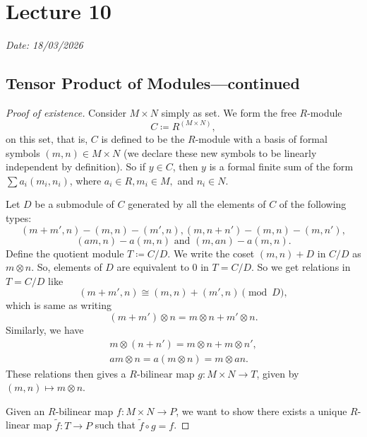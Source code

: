 \chapter{Lecture 10}

\hfill {\footnotesize \textit{Date: 18/03/2026}}

\section{Tensor Product of Modules---continued}
\begin{proof}[Proof of existence]
    Consider \( M \times N \) simply as set. We form the free  \( R \)-module
     \[
        C \coloneq R^{(M \times N)},
    \]
     on this set, that is, \( C \) is defined to be the  \( R \)-module with a basis of formal symbols  \( (m, n) \in M \times N \) (we declare these new symbols to be linearly independent by definition).  So if  \( y \in C \), then \( y \) is a formal finite sum of the form  \( \sum a_i(m_i, n_i) \), where  \( a_i \in R, m_i \in M, \) and  \( n_i \in N \).

    Let \( D \) be a submodule of  \( C \) generated by all the elements of \( C \) of the following types:
    \[
        (m + m', n) - (m, n) - (m', n), (m, n + n') - (m, n) - (m, n'),
    \]
    \[
        (am, n) - a(m, n) \text{ and } (m, an) - a(m, n).
    \]
    Define the quotient module \( T \coloneq C / D \). We write the coset \( (m, n) + D \) in \( C / D \) as  \( m \otimes n \). So, elements of \( D \) are equivalent to \( 0 \) in  \( T = C / D \). So we get relations in  \( T = C / D \) like
    \[
        (m + m', n) \cong (m, n) + (m', n) \pmod{D},
    \]
    which is same as writing
    \[
        (m + m') \otimes n = m \otimes n + m' \otimes n.
    \]
    Similarly, we have
    \begin{gather*}
        m \otimes (n + n') = m \otimes n + m \otimes n',\\
        am \otimes n = a(m \otimes n) = m \otimes an.
    \end{gather*}
    These relations then gives a \( R \)-bilinear map \( g: M \times N \to T \), given by \( (m, n) \mapsto m \otimes n \).

    Given an \( R \)-bilinear map  \( f: M \times N \to P \), we want to show there exists a unique  \( R \)-linear map  \( \widetilde{f}: T \to P \) such that \( \widetilde{f} \circ g = f \).


\end{proof}
